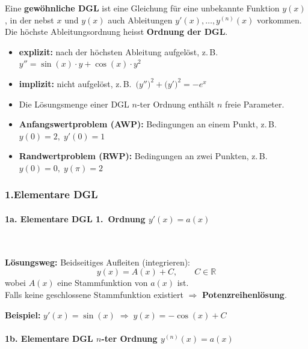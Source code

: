 \documentclass[../../zusammenfassung_AN.tex]{subfiles}
\begin{document}
	
	\begin{tcolorbox}[dglbox, title={Grundbegriffe}]
		Eine \textbf{gewöhnliche DGL} ist eine Gleichung für eine unbekannte Funktion $y(x)$,
		in der nebst $x$ und $y(x)$ auch Ableitungen $y'(x), \dots, y^{(n)}(x)$ vorkommen.
		Die höchste Ableitungsordnung heisst \textbf{Ordnung der DGL}.
		\begin{itemize}[noitemsep, topsep=2pt]
			\item \textbf{explizit:} nach der höchsten Ableitung aufgelöst, z.\,B.\
			$y'' = \sin(x)\cdot y + \cos(x)\cdot y^2$
			\item \textbf{implizit:} nicht aufgelöst, z.\,B.\
			$\bigl(y''\bigr)^2 + \bigl(y'\bigr)^2 = -e^x$
			\item Die Lösungsmenge einer DGL $n$-ter Ordnung enthält $n$ freie Parameter.
			\item \textbf{Anfangswertproblem (AWP):} Bedingungen an einem Punkt, z.\,B.\ $y(0)=2,\;y'(0)=1$
			\item \textbf{Randwertproblem (RWP):} Bedingungen an zwei Punkten, z.\,B.\ $y(0)=0,\;y(\pi)=2$
		\end{itemize}
	\end{tcolorbox}
	
	\vspace{0.8em}
	
	\subsubsection*{\color{mainblue}1.\quad Elementare DGL}
	
	\paragraph*{1a. Elementare DGL 1.\ Ordnung \quad $y'(x)=a(x)$}\mbox{}\\
	
	\begin{tcolorbox}[formelbox]
		\textbf{Lösungsweg:} Beidseitiges Aufleiten (integrieren):
		\[
		y(x) = A(x) + C, \qquad C \in \mathbb{R}
		\]
		wobei $A(x)$ eine Stammfunktion von $a(x)$ ist.\\
		Falls keine geschlossene Stammfunktion existiert $\Rightarrow$ \textbf{Potenzreihenlösung}.
	\end{tcolorbox}
	
	\textbf{Beispiel:} $y'(x)=\sin(x) \;\Rightarrow\; y(x) = -\cos(x)+C$
	
	\paragraph*{1b. Elementare DGL $n$-ter Ordnung \quad $y^{(n)}(x)=a(x)$}\mbox{}\\
	
\end{document}
